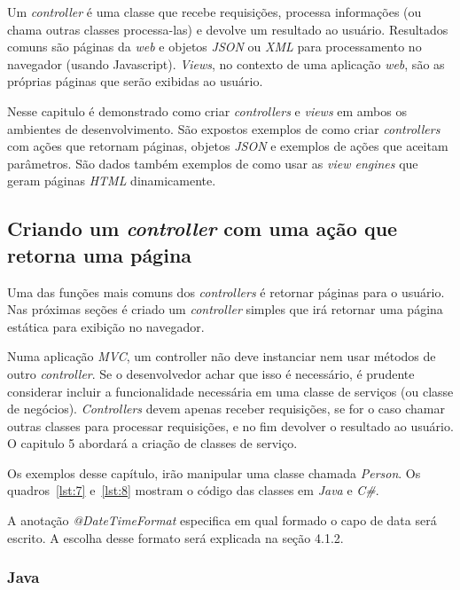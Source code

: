 \documentclass[a4paper,12pt]{article}
\newcommand{\est}[1] {
\textit{#1}}
\newcommand{\classe}[1] {
\textit{#1}}
\newcommand{\sigla}[1] {
\textit{#1}}
\newcommand{\lang}[1] {
\textit{#1}}
\newcommand{\annotation}[1] {
\textit{#1}}
\newcommand{\javacode}[3] {
	
}
\newcommand{\sharpcode}[3] {
	
}
\begin{document}
Um \est{controller} é uma classe que  recebe requisições, processa informações (ou chama outras classes processa-las) e devolve um resultado ao usuário. Resultados comuns são páginas da \est{web} e objetos \sigla{JSON} ou \sigla{XML} para processamento no navegador (usando Javascript). \est{Views}, no contexto de uma aplicação \est{web}, são as próprias páginas que serão exibidas ao usuário.

Nesse capitulo é demonstrado como criar \est{controllers} e \est{views} em ambos os ambientes de desenvolvimento. São expostos exemplos de como criar \est{controllers} com ações que retornam páginas, objetos \sigla{JSON} e exemplos de ações que aceitam parâmetros. São dados também exemplos de como usar as \est{view engines} que geram páginas \sigla{HTML} dinamicamente.

\subsection{Criando um \est{controller} com uma ação que retorna uma página}

Uma das funções mais comuns dos \est{controllers} é retornar páginas para o usuário. Nas próximas seções é criado um \est{controller} simples que irá retornar uma página estática para exibição no navegador.

Numa aplicação \sigla{MVC}, um controller não deve instanciar nem usar métodos de outro \est{controller}. Se o desenvolvedor achar que isso é necessário, é prudente considerar incluir a funcionalidade necessária em uma classe de serviços (ou classe de negócios). \est{Controllers} devem apenas receber requisições, se for o caso chamar outras classes para processar requisições, e no fim devolver o resultado ao usuário. O capitulo 5 abordará a criação de classes de serviço.

Os exemplos desse capítulo, irão manipular uma classe chamada \classe{Person}. Os quadros~\ref{lst:7} e~\ref{lst:8} mostram o código das classes em \lang{Java} e \lang{C\#}.

\javacode{code/7.txt}{Classe \classe{Person} em Java}{lst:7}

A anotação \annotation{@DateTimeFormat} especifica em qual formado o capo de data será escrito. A escolha desse formato será explicada na seção 4.1.2.

\sharpcode{code/8.txt}{Classe \classe{Person} em C\#}{lst:8}

\subsubsection{Java}
\end{document}
